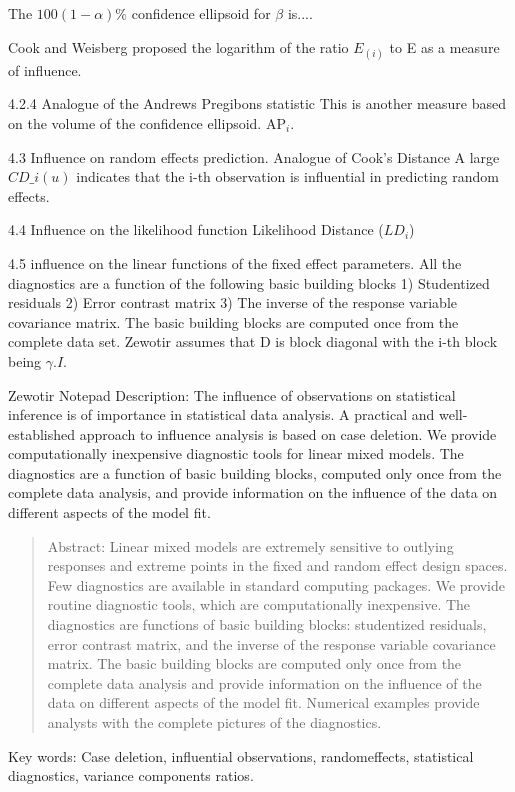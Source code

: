 \documentclass[12pt, a4paper]{article}
\begin{document}
The $100(1-\alpha)\%$ confidence ellipsoid for $\beta$ is....

Cook and Weisberg proposed the logarithm of the ratio $E_{(i)}$ to E as a measure of influence.




4.2.4 Analogue of the Andrews Pregibons statistic
This is another measure based on the volume of the confidence ellipsoid. AP$_i$.

4.3 Influence on random effects prediction.
Analogue of Cook’s Distance
A large $CD\_i(u)$ indicates that the i-th observation is influential in predicting random effects.

4.4 Influence on the likelihood function
Likelihood Distance ($LD_i$)

4.5 influence on the linear functions of the fixed effect parameters.
All the diagnostics are a function of the following basic building blocks
1)  	Studentized residuals
2)  	Error contrast matrix
3)  	The inverse of the response variable covariance matrix.
The basic building blocks are computed once from the complete data set.
Zewotir assumes that D is block diagonal with the i-th block being $\gamma. I$.


\newpage
Zewotir Notepad
Description: The influence of observations on statistical inference is of importance in statistical data analysis. 
A practical and well-established approach to influence analysis is based on case deletion. 
We provide computationally inexpensive diagnostic tools for linear mixed models. 
The diagnostics are a function of basic building blocks, computed only once from the complete data analysis, 
and provide information on the influence of the data on different aspects of the model fit.


\begin{quote}
	Abstract: Linear mixed models are extremely sensitive to outlying responses and extreme points in the fixed and random effect design spaces. Few diagnostics are available in standard computing packages. We provide routine diagnostic tools, which are computationally inexpensive. The diagnostics
	are functions of basic building blocks: studentized residuals, error contrast matrix, and the inverse of the response variable covariance matrix. The basic building blocks are computed only once from the complete data analysis and provide information on the influence of the data on different aspects
	of the model fit. Numerical examples provide analysts with the complete pictures of the diagnostics.
\end{quote}
Key words: Case deletion, influential observations, randomeffects, statistical
diagnostics, variance components ratios.
\end{document}
